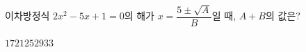 이차방정식 $2x^2-5x+1=0$의 해가 $x=\dfrac{5\pm\sqrt{A}}{B}$일 때, $A+B$의 값은? 
\begin{choices32}{$17$}{$21$}{$25$}{$29$}{$33$}\end{choices32}
